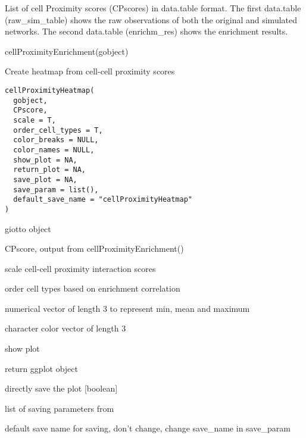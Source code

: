 \documentclass[a4paper]{book}
\begin{document}
%
\begin{Value}
List of cell Proximity scores (CPscores) in data.table format. The first
data.table (raw\_sim\_table) shows the raw observations of both the original and
simulated networks. The second data.table (enrichm\_res) shows the enrichment results.
\end{Value}
%
\begin{Examples}
\begin{ExampleCode}
    cellProximityEnrichment(gobject)
\end{ExampleCode}
\end{Examples}
%
\begin{Description}\relax
Create heatmap from cell-cell proximity scores
\end{Description}
%
\begin{Usage}
\begin{verbatim}
cellProximityHeatmap(
  gobject,
  CPscore,
  scale = T,
  order_cell_types = T,
  color_breaks = NULL,
  color_names = NULL,
  show_plot = NA,
  return_plot = NA,
  save_plot = NA,
  save_param = list(),
  default_save_name = "cellProximityHeatmap"
)
\end{verbatim}
\end{Usage}
%
\begin{Arguments}
\begin{ldescription}
\item[\code{gobject}] giotto object

\item[\code{CPscore}] CPscore, output from cellProximityEnrichment()

\item[\code{scale}] scale cell-cell proximity interaction scores

\item[\code{order\_cell\_types}] order cell types based on enrichment correlation

\item[\code{color\_breaks}] numerical vector of length 3 to represent min, mean and maximum

\item[\code{color\_names}] character color vector of length 3

\item[\code{show\_plot}] show plot

\item[\code{return\_plot}] return ggplot object

\item[\code{save\_plot}] directly save the plot [boolean]

\item[\code{save\_param}] list of saving parameters from 

\item[\code{default\_save\_name}] default save name for saving, don't change, change save\_name in save\_param
\end{ldescription}
\end{Arguments}
\end{document}
